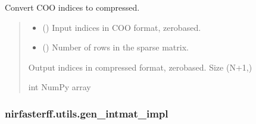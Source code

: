 \documentclass[letterpaper,10pt,english]{sphinxmanual}
\begin{document}
\begin{fulllineitems}
\label{\detokenize{_autosummary/nirfasterff.utils.compress_coo:nirfasterff.utils.compress_coo}}
\pysigstartsignatures
\pysiglinewithargsret
{}
{\sphinxparamcomma {}}
{}
\pysigstopsignatures
\sphinxAtStartPar
Convert COO indices to compressed.
\begin{quote}\begin{description}
\begin{itemize}
\item {} 
\sphinxAtStartPar
{} () \textendash{} Input indices in COO format, zero\sphinxhyphen{}based.

\item {} 
\sphinxAtStartPar
{} () \textendash{} Number of rows in the sparse matrix.

\end{itemize}

\sphinxAtStartPar
Output indices in compressed format, zero\sphinxhyphen{}based. Size (N+1,)

\sphinxAtStartPar
int NumPy array

\end{description}\end{quote}

\end{fulllineitems}


\sphinxstepscope


\subsubsection{nirfasterff.utils.gen\_intmat\_impl}
\label{\detokenize{_autosummary/nirfasterff.utils.gen_intmat_impl:nirfasterff-utils-gen-intmat-impl}}\label{\detokenize{_autosummary/nirfasterff.utils.gen_intmat_impl::doc}}
\end{document}
